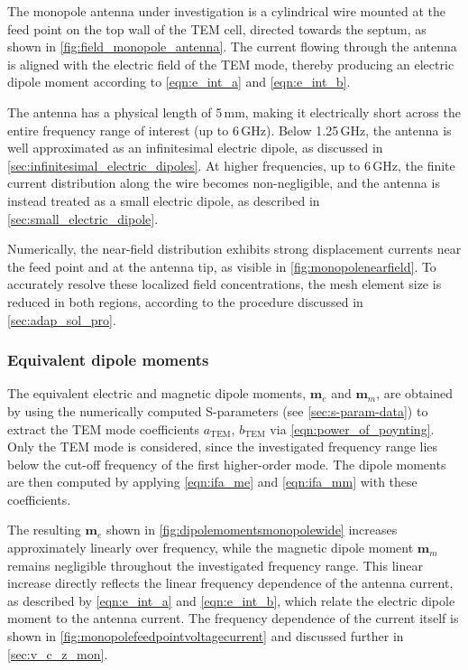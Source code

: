 The monopole antenna under investigation is a cylindrical wire mounted at the feed point on the top wall of the TEM cell, directed towards the septum, as shown in \autoref{fig:field_monopole_antenna}. The current flowing through the antenna is aligned with the electric field of the TEM mode, thereby producing an electric dipole moment according to \eqref{eqn:e_int_a} and \eqref{eqn:e_int_b}.

The antenna has a physical length of 5\,mm, making it electrically short across the entire frequency range of interest (up to 6\,GHz). Below 1.25\,GHz, the antenna is well approximated as an infinitesimal electric dipole, as discussed in \cref{sec:infinitesimal_electric_dipoles}. At higher frequencies, up to 6\,GHz, the finite current distribution along the wire becomes non-negligible, and the antenna is instead treated as a small electric dipole, as described in \cref{sec:small_electric_dipole}.

Numerically, the near-field distribution exhibits strong displacement currents near the feed point and at the antenna tip, as visible in \autoref{fig:monopolenearfield}. To accurately resolve these localized field concentrations, the mesh element size is reduced in both regions, according to the procedure discussed in \cref{sec:adap_sol_pro}.

\subsubsection{Equivalent dipole moments}\label{sec:eq_dip_mon}

The equivalent electric and magnetic dipole moments, $\mathbf{m}_e$ and 
$\mathbf{m}_m$, are obtained by using the numerically computed S-parameters 
(see \cref{sec:s-param-data}) to extract the TEM mode coefficients 
$a_\mathrm{TEM}$, $b_\mathrm{TEM}$ via \eqref{eqn:power_of_poynting}. 
Only the TEM mode is considered, since the investigated frequency range 
lies below the cut-off frequency of the first higher-order mode. The dipole 
moments are then computed by applying \eqref{eqn:ifa_me} and 
\eqref{eqn:ifa_mm} with these coefficients.

The resulting $\mathbf{m}_e$ shown in \autoref{fig:dipolemomentsmonopolewide} increases approximately linearly over frequency, while the magnetic dipole moment $\mathbf{m}_m$ remains negligible throughout the investigated frequency range. This linear increase directly reflects the linear frequency dependence of the antenna current, as described by \eqref{eqn:e_int_a} and \eqref{eqn:e_int_b}, which relate the electric dipole moment to the antenna current. The frequency dependence of the current itself is shown in \autoref{fig:monopolefeedpointvoltagecurrent} and discussed further in \cref{sec:v_c_z_mon}.

